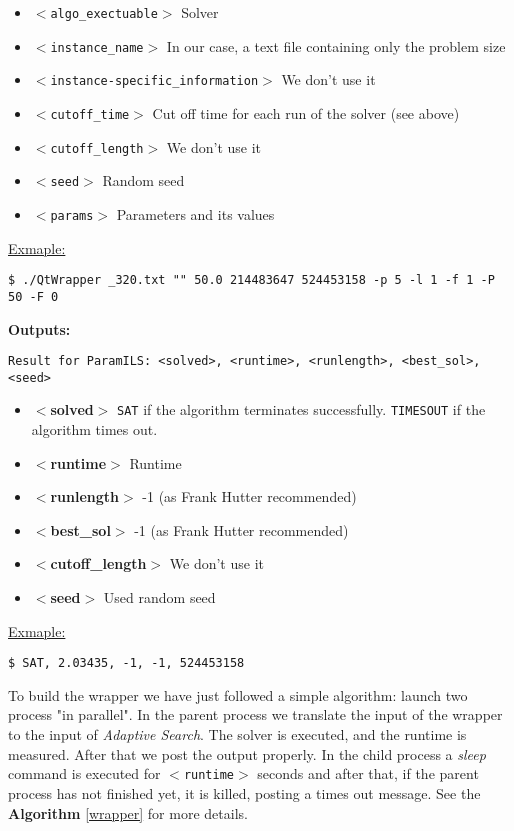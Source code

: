\begin{itemize}
	\item \texttt{$<$algo\_exectuable$>$} Solver 
	\item \texttt{$<$instance\_name$>$} In our case, a text file containing only the problem size
	\item \texttt{$<$instance-specific\_information$>$} We don't use it 
	\item \texttt{$<$cutoff\_time$>$} Cut off time for each run of the solver (see above)
	\item \texttt{$<$cutoff\_length$>$} We don't use it
	\item \texttt{$<$seed$>$} Random seed
	\item \texttt{$<$params$>$} Parameters and its values
\end{itemize}

\underline{Exmaple:}

\begin{verbatim}
$ ./QtWrapper _320.txt "" 50.0 214483647 524453158 -p 5 -l 1 -f 1 -P 50 -F 0
\end{verbatim}

\textbf{\large Outputs:} 

\begin{verbatim}
Result for ParamILS: <solved>, <runtime>, <runlength>, <best_sol>, <seed>
\end{verbatim}

\begin{itemize}
	\item {\bf $<$solved$>$} \texttt{SAT} if the algorithm terminates successfully. \texttt{TIMESOUT} if the algorithm times out.
	\item {\bf $<$runtime$>$} Runtime
	\item {\bf $<$runlength$>$} -1 (as Frank Hutter recommended)
	\item {\bf $<$best\_sol$>$} -1 (as Frank Hutter recommended)
	\item {\bf $<$cutoff\_length$>$} We don't use it
	\item {\bf $<$seed$>$} Used random seed
\end{itemize}

\underline{Exmaple:}

\begin{verbatim}
$ SAT, 2.03435, -1, -1, 524453158
\end{verbatim}

To build the wrapper we have just followed a simple algorithm: launch two process "in parallel". In the parent process we translate the input of the wrapper to the input of {\it Adaptive Search}. The solver is executed, and the runtime is measured. After that we post the output properly. In the child process a {\it sleep} command is executed for \texttt{$<$runtime$>$} seconds and after that, if the parent process has not finished yet, it is killed, posting a times out message. See the {\bf Algorithm} \ref{wrapper} for more details.


